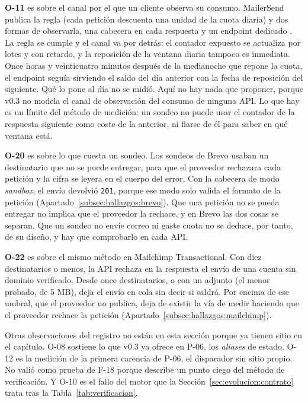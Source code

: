 \textbf{O-11} es sobre el canal por el que un cliente observa su consumo.
MailerSend publica la regla (cada petición descuenta una unidad de la cuota diaria)
y dos formas de observarla, una cabecera en cada respuesta y un endpoint dedicado
\citep{mailersenddocs}. La regla se cumple y el canal va por detrás: el contador
expuesto se actualiza por lotes y con retardo, y la reposición de la ventana diaria
tampoco es inmediata. Once horas y veinticuatro minutos después de la medianoche que repone
la cuota, el endpoint seguía sirviendo el saldo del día anterior con la fecha de
reposición del siguiente. Qué lo pone al día no se midió. Aquí no hay nada que proponer, porque v0.3 no modela el
canal de observación del consumo de ninguna API. Lo que hay es un límite del método
de medición: un sondeo no puede usar el contador de la respuesta siguiente como
coste de la anterior, ni fiarse de él para saber en qué ventana está.

\textbf{O-20} es sobre lo que cuesta un sondeo.
Los sondeos de Brevo usaban un destinatario que no se puede entregar, para que el proveedor rechazara cada petición y la cifra se leyera en el cuerpo del error.
Con la cabecera de modo \textit{sandbox}, el envío devolvió \texttt{201}, porque ese modo solo valida el formato de la petición (Apartado~\ref{subsec:hallazgos:brevo}).
Que una petición no se pueda entregar no implica que el proveedor la rechace, y en Brevo las dos cosas se separan.
Que un sondeo no envíe correo ni gaste cuota no se deduce, por tanto, de su diseño, y hay que comprobarlo en cada API.

\textbf{O-22} es sobre el mismo método en Mailchimp Transactional.
Con diez destinatarios o menos, la API rechaza en la respuesta el envío de una cuenta sin dominio verificado.
Desde once destinatarios, o con un adjunto (el menor probado, de 5 MB), deja el envío en cola sin decir si saldrá.
Por encima de ese umbral, que el proveedor no publica, deja de existir la vía de medir haciendo que el proveedor rechace la petición (Apartado~\ref{subsec:hallazgos:mailchimp}).

Otras observaciones del registro no están en esta sección porque ya tienen sitio en el capítulo.
O-08 sostiene lo que v0.3 ya ofrece en P-06, los \textit{aliases} de estado.
O-12 es la medición de la primera carencia de P-06, el disparador sin sitio propio.
No valió como prueba de F-18 porque describe un punto ciego del método de verificación.
Y O-10 es el fallo del motor que la Sección~\ref{sec:evolucion:contrato} trata tras la Tabla~\ref{tab:verificacion}.


